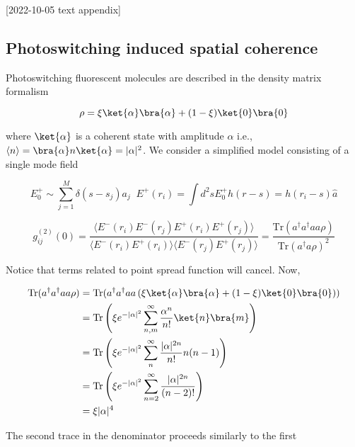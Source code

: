 \usepackage{amsmath}
[2022-10-05 text appendix]


\subsection{Photoswitching induced spatial coherence}

Photoswitching fluorescent molecules are described in the density matrix formalism

\begin{equation*}
\rho = \xi\ket{\alpha}\bra{\alpha} + (1-\xi)\ket{0}\bra{0}
\end{equation*}

where $\ket{\alpha}$ is a coherent state with amplitude $\alpha$ i.e., $\langle n\rangle = \bra{\alpha} n\ket{\alpha} = |\alpha|^{2}$. We consider a simplified model consisting of a single mode field 

\begin{equation*}
E_{0}^{+}\sim \sum_{j=1}^{M}\delta(s-s_{j})a_{j} \;\; E^{+}(r_{i}) = \int d^{2}s E_{0}^{+} h(r-s) = h(r_{i}-s)\hat{a}
\end{equation*}

\begin{equation*}
g^{(2)}_{ij}(0) = \frac{\langle E^{-}(r_{i})E^{-}(r_{j})E^{+}(r_{i})E^{+}(r_{j}) \rangle}{\langle E^{-}(r_{i})E^{+}(r_{i})\rangle\langle E^{-}(r_{j})E^{+}(r_{j})\rangle} = \frac{\mathrm{Tr}(a^{\dagger}a^{\dagger}aa\rho)}{\mathrm{Tr}(a^{\dagger}a\rho)^{2}}
\end{equation*}

Notice that terms related to point spread function will cancel. Now,

\begin{align*}
\mathrm{Tr}(a^{\dagger}a^{\dagger}aa\rho) &= \mathrm{Tr}(a^{\dagger}a^{\dagger}aa \left(\xi\ket{\alpha}\bra{\alpha} + (1-\xi)\ket{0}\bra{0}\right))\\
&= \mathrm{Tr}\left(\xi e^{-|\alpha|^{2}}\sum_{n,m}^{\infty}\frac{\alpha^{n}}{n!}\ket{n}\bra{m}\right)\\
&= \mathrm{Tr}\left(\xi e^{-|\alpha|^{2}}\sum_{n}^{\infty}\frac{|\alpha|^{2n}}{n!}n(n-1)\right)\\
&= \mathrm{Tr}\left(\xi e^{-|\alpha|^{2}}\sum_{n=2}^{\infty}\frac{|\alpha|^{2n}}{(n-2)!}\right)\\
&= \xi|\alpha|^{4}
\end{align*}

The second trace in the denominator proceeds similarly to the first

